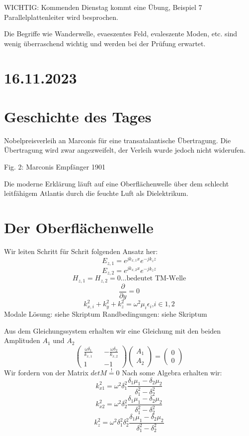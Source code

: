\documentclass[a4paper]{article}
\begin{document}
WICHTIG: Kommenden Dienstag kommt eine Übung, Beispiel 7 Parallelplattenleiter wird besprochen.

Die Begriffe wie Wanderwelle, evaeszentes Feld, evaleszente Moden, etc. sind wenig überraschend wichtig und werden bei der Prüfung erwartet.

\section*{16.11.2023}
\section*{Geschichte des Tages}
Nobelpreisverleih an Marconis für eine transatalantische Übertragung. Die Übertragung wird zwar angezweifelt, der Verleih wurde jedoch nicht widerufen.

Fig. 2: Marconis Empfänger 1901

Die moderne Erklärung läuft auf eine Oberflächenwelle über dem schlecht leitfähigem Atlantis durch die feuchte Luft als Dielektrikum.

\section*{Der Oberflächenwelle}
Wir leiten Schritt für Schrit folgenden Ansatz her:
\[ E_{z,1}=e^{jk_{x,1}x} e^{-jk_{z}z} \]
\[ E_{z,2}=e^{jk_{x,2}x} e^{-jk_{z}z}\]
\[ H_{z,1}=H_{z,2}=0 \text{\ldots bedeutet TM-Welle} \]
\[ \frac{\partial}{\partial y}=0\]
\[ k_{x,i}^{2}+k_{y}^{2}+k_{z}^{2}=\omega^2\mu_{i}\epsilon_{i}\text{,} i \in {1,2} \]
Modale Lösung: siehe Skriptum
Randbedingungen: siehe Skriptum

Aus dem Gleichungssystem erhalten wir eine Gleichung mit den beiden Amplituden $A_{1}$ und $A_{2}$
 \[ 
 \begin{pmatrix}
 \frac{\omega\delta_{1}}{k_{x,1}} && -\frac{\omega\delta_{2}}{k_{x,2}}\\
 1 && -1
 \end{pmatrix} 
\begin{pmatrix} A_{1}\\ A_{2}\end{pmatrix}
= \begin{pmatrix} 0\\ 0\end{pmatrix}
\]
Wir fordern von der Matrix $det M \overset{!}{=}0$
Nach some Algebra erhalten wir:
\[ k_{x1}^{2}= \omega^{2}\delta_{1}^{2} \frac{\delta_{1}\mu_{1}-\delta_{2}\mu_{2}}{\delta_{1}^{2}-\delta_{2}^{2}}\]
\[ k_{x2}^{2}= \omega^{2}\delta_{2}^{2} \frac{\delta_{1}\mu_{1}-\delta_{2}\mu_{2}}{\delta_{1}^{2}-\delta_{2}^{2}}\]
\[ k_{z}^{2}= \omega^{2}\delta_{1}^{2}\delta_{2}^{2} \frac{\delta_{1}\mu_{1}-\delta_{2}\mu_{2}}{\delta_{1}^{2}-\delta_{2}^{2}}\]
\end{document}
